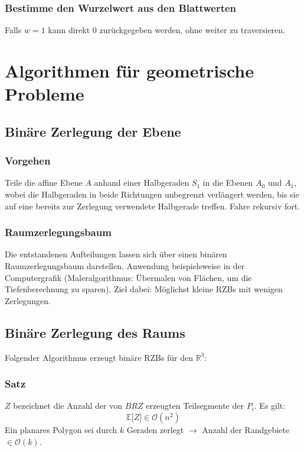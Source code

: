 \subsubsection{Bestimme den Wurzelwert aus den Blattwerten}


Falls \(w=1\) kann direkt \(0\) zurückgegeben werden, ohne weiter zu traversieren.



\section{Algorithmen für geometrische Probleme}

\subsection{Binäre Zerlegung der Ebene}

\subsubsection{Vorgehen}
Teile die affine Ebene \(A\) anhand einer Halbgeraden \(S_1\) in die Ebenen \(A_0\) und \(A_1\), wobei die Halbgeraden in beide Richtungen unbegrenzt verlängert werden, bis sie auf eine bereits zur Zerlegung verwendete Halbgerade treffen. Fahre rekursiv fort.

\subsubsection{Raumzerlegungsbaum}
Die entstandenen Aufteilungen lassen sich über einen binären Raumzerlegungsbaum darstellen. Anwendung beispielsweise in der Computergrafik (Maleralgorithmus: Übermalen von Flächen, um die Tiefenberechnung zu sparen).
Ziel dabei: Möglichst kleine RZBs mit wenigen Zerlegungen.


\subsection{Binäre Zerlegung des Raums}
Folgender Algorithmus erzeugt binäre RZBs für den \(\mathbb{R}^3\):
\text{}\\


\subsubsection{Satz}
\(Z\) bezeichnet die Anzahl der von \(BRZ\) erzeugten Teilsegmente der \(P_i\). Es gilt:
\[\mathbb{E}\lbrack Z \rbrack \in \mathcal{O}(n^2)\]
Ein planares Polygon sei durch \(k\) Geraden zerlegt \(\rightarrow\) Anzahl der Randgebiete \(\in \mathcal{O}(k)\).


